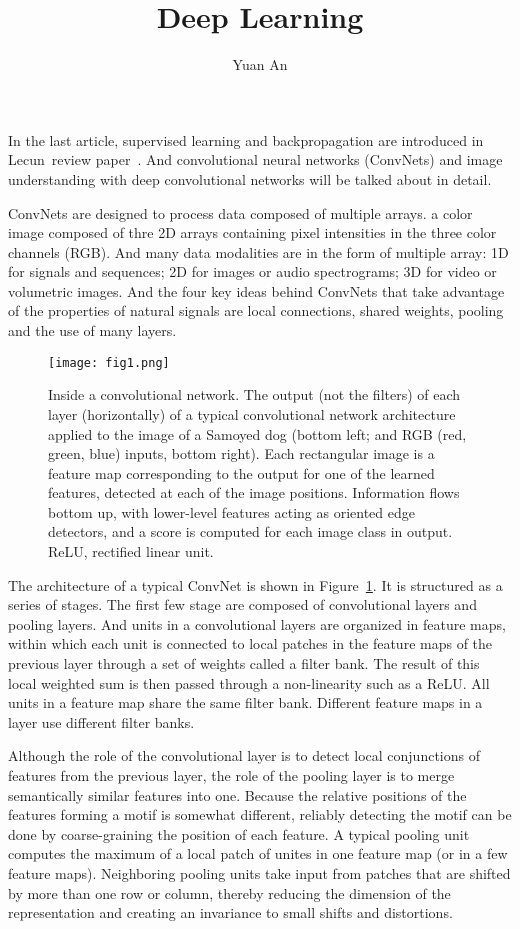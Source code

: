 \documentclass[10pt,twocolumn,letterpaper]{article}
\begin{document}
	\title{Deep Learning}	
	\author{Yuan An}
	\maketitle
	In the last article, supervised learning and backpropagation are introduced in Lecun~\etal review paper~\cite{DeepLearning}. And convolutional neural networks (ConvNets) and image understanding with deep convolutional networks will be talked about in detail.
	\par
	ConvNets are designed to process data composed of multiple arrays. \Eg a color image composed of thre 2D arrays containing pixel intensities in the three color channels (RGB). And many data modalities are in the form of multiple array: 1D for signals and sequences; 2D for images or audio spectrograms; 3D for video or volumetric images. And the four key ideas behind ConvNets that take advantage of the properties of natural signals are local connections, shared weights, pooling and the use of many layers.
	\begin{figure}[h]
		\centering
		\texttt{[image: fig1.png]}
		\caption{Inside a convolutional network. The output (not the filters) of each layer (horizontally) of a typical convolutional network architecture applied to the image of a Samoyed dog (bottom left; and RGB (red, green, blue) inputs, bottom right). Each rectangular image is a feature map corresponding to the output for one of the learned features, detected at each of the image positions. Information flows bottom up, with lower-level features acting as oriented edge detectors, and a score is computed for each image class in output. ReLU, rectified linear unit.} \label{ConvNets}
	\end{figure}
	\par
	The architecture of a typical ConvNet is shown in Figure~\ref{ConvNets}. It is structured as a series of stages. The first few stage are composed of convolutional layers and pooling layers. And units in a convolutional layers are organized in feature maps, within which each unit is connected to local patches in the feature maps of the previous layer through a set of weights called a filter bank. The result of this local weighted sum is then passed through a non-linearity such as a ReLU. All units in a feature map share the same filter bank. Different feature maps in a layer use different filter banks.
	\par
	Although the role of the convolutional layer is to detect local conjunctions of features from the previous layer, the role of the pooling layer is to merge semantically similar features into one. Because the relative positions of the features forming a motif is somewhat different, reliably detecting the motif can be done by coarse-graining the position of each feature. A typical pooling unit computes the maximum of a local patch of unites in one feature map (or in a few feature maps). Neighboring pooling units take input from patches that are shifted by more than one row or column, thereby reducing the dimension of the representation and creating an invariance to small shifts and distortions.
\end{document}
